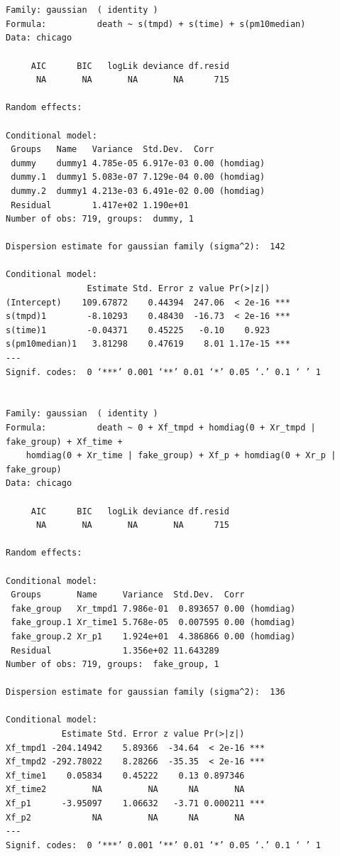 \begin{verbatim}
    

Family: gaussian  ( identity )
Formula:          death ~ s(tmpd) + s(time) + s(pm10median)
Data: chicago

     AIC      BIC   logLik deviance df.resid 
      NA       NA       NA       NA      715 

Random effects:

Conditional model:
 Groups   Name   Variance  Std.Dev.  Corr          
 dummy    dummy1 4.785e-05 6.917e-03 0.00 (homdiag)
 dummy.1  dummy1 5.083e-07 7.129e-04 0.00 (homdiag)
 dummy.2  dummy1 4.213e-03 6.491e-02 0.00 (homdiag)
 Residual        1.417e+02 1.190e+01               
Number of obs: 719, groups:  dummy, 1

Dispersion estimate for gaussian family (sigma^2):  142 

Conditional model:
                Estimate Std. Error z value Pr(>|z|)    
(Intercept)    109.67872    0.44394  247.06  < 2e-16 ***
s(tmpd)1        -8.10293    0.48430  -16.73  < 2e-16 ***
s(time)1        -0.04371    0.45225   -0.10    0.923    
s(pm10median)1   3.81298    0.47619    8.01 1.17e-15 ***
---
Signif. codes:  0 ‘***’ 0.001 ‘**’ 0.01 ‘*’ 0.05 ‘.’ 0.1 ‘ ’ 1


Family: gaussian  ( identity )
Formula:          death ~ 0 + Xf_tmpd + homdiag(0 + Xr_tmpd | fake_group) + Xf_time +  
    homdiag(0 + Xr_time | fake_group) + Xf_p + homdiag(0 + Xr_p |      fake_group)
Data: chicago

     AIC      BIC   logLik deviance df.resid 
      NA       NA       NA       NA      715 

Random effects:

Conditional model:
 Groups       Name     Variance  Std.Dev.  Corr          
 fake_group   Xr_tmpd1 7.986e-01  0.893657 0.00 (homdiag)
 fake_group.1 Xr_time1 5.768e-05  0.007595 0.00 (homdiag)
 fake_group.2 Xr_p1    1.924e+01  4.386866 0.00 (homdiag)
 Residual              1.356e+02 11.643289               
Number of obs: 719, groups:  fake_group, 1

Dispersion estimate for gaussian family (sigma^2):  136 

Conditional model:
           Estimate Std. Error z value Pr(>|z|)    
Xf_tmpd1 -204.14942    5.89366  -34.64  < 2e-16 ***
Xf_tmpd2 -292.78022    8.28266  -35.35  < 2e-16 ***
Xf_time1    0.05834    0.45222    0.13 0.897346    
Xf_time2         NA         NA      NA       NA    
Xf_p1      -3.95097    1.06632   -3.71 0.000211 ***
Xf_p2            NA         NA      NA       NA    
---
Signif. codes:  0 ‘***’ 0.001 ‘**’ 0.01 ‘*’ 0.05 ‘.’ 0.1 ‘ ’ 1

\end{verbatim}

